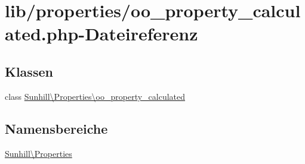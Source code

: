 \hypertarget{oo__property__calculated_8php}{}\section{lib/properties/oo\+\_\+property\+\_\+calculated.php-\/\+Dateireferenz}
\label{oo__property__calculated_8php}
\subsection*{Klassen}
\begin{DoxyCompactItemize}
\item 
class \hyperlink{classSunhill_1_1Properties_1_1oo__property__calculated}{Sunhill\textbackslash{}\+Properties\textbackslash{}oo\+\_\+property\+\_\+calculated}
\end{DoxyCompactItemize}
\subsection*{Namensbereiche}
\begin{DoxyCompactItemize}
\item 
 \hyperlink{namespaceSunhill_1_1Properties}{Sunhill\textbackslash{}\+Properties}
\end{DoxyCompactItemize}

